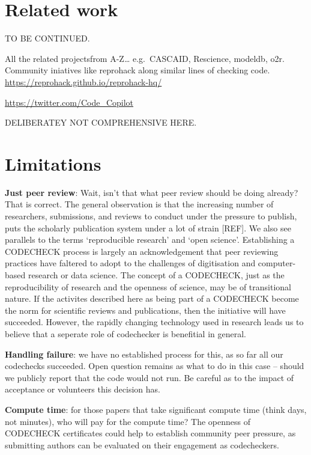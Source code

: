 \documentclass[12pt]{article}
\begin{document}
\section*{Related work}\label{related-work}

TO BE CONTINUED.

All the related projectsfrom A-Z\ldots{} e.g.~CASCAID, Rescience,
modeldb, o2r. Community iniatives like reprohack along similar lines of
checking code. \url{https://reprohack.github.io/reprohack-hq/}

\url{https://twitter.com/Code_Copilot}


DELIBERATEY NOT COMPREHENSIVE HERE.

\section*{Limitations}\label{limitations}

\textbf{Just peer review}: Wait, isn't that what peer review should be 
doing already? That is correct.
The general observation is that the increasing
number of researchers, submissions, and reviews to conduct under the
pressure to publish, puts the scholarly publication system under a lot
of strain [REF].  We also see parallels to the terms 
`reproducible research' and `open science'. Establishing a CODECHECK 
process is largely an acknowledgement that peer reviewing practices 
have faltered to adopt to the challenges of digitisation and computer-based
research or data science. The concept of a CODECHECK, just as the 
reproducibility of research and the openness of science, may be of 
transitional nature. If the activites described here as being part of a 
CODECHECK become the norm for scientific reviews and publications, then
the initiative will have succeeded.
However, the rapidly changing technology used in  research leads us to 
believe that a seperate role of codechecker is benefitial in general.

\textbf{Handling failure}: we have no established process for this, as
so far all our codechecks succeeded. Open question remains as what to do
in this case -- should we publicly report that the code would not run.
Be careful as to the impact of acceptance or volunteers this decision
has.

\textbf{Compute time}: for those papers that take significant compute
time (think days, not minutes), who will pay for the compute time?
The openness of CODECHECK certificates could help to establish community
peer pressure, as submitting authors can be evaluated on their engagement
as codecheckers.
\end{document}
